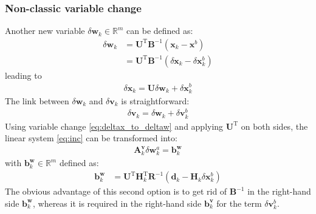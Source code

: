 \documentclass[12pt]{scrartcl}
\begin{document}
\subsubsection{Non-classic variable change}
Another new variable $\delta \mathbf{w}_k \in \mathbb{R}^m$ can be defined as:
\begin{align}
\delta \mathbf{w}_k & = \mathbf{U}^\mathrm{T} \mathbf{B}^{-1} \left(\mathbf{x}_k - \mathbf{x}^b\right) \nonumber \\
 & = \mathbf{U}^\mathrm{T} \mathbf{B}^{-1} \left(\delta \mathbf{x}_k - \delta \mathbf{x}^b_k\right)
\end{align}
leading to
\begin{align}
\label{eq:deltax_to_deltaw}
\boxed{\delta \mathbf{x}_k = \mathbf{U} \delta \mathbf{w}_k + \delta \mathbf{x}^b_k}
\end{align}
The link between $\delta \mathbf{w}_k$ and $\delta \mathbf{v}_k$ is straightforward:
\begin{align}
\label{eq:link_deltaw-deltav}
\delta \mathbf{v}_k = \delta \mathbf{w}_k + \delta \mathbf{v}^b_k
\end{align}
Using variable change \eqref{eq:deltax_to_deltaw} and applying $\mathbf{U}^\mathrm{T}$ on both sides, the linear system \eqref{eq:inc} can be transformed into:
\begin{align}
\label{eq:inc_U_w}
\boxed{\mathbf{A}^\mathbf{v}_k \delta \mathbf{w}^a_k = \mathbf{b}^\mathbf{w}_k}
\end{align}
with $\mathbf{b}^\mathbf{w}_k \in \mathbb{R}^{m}$ defined as:
\begin{align}
\mathbf{b}^\mathbf{w}_k & = \mathbf{U}^\mathrm{T} \mathbf{H}_k^\mathrm{T} \mathbf{R}^{-1} \left(\mathbf{d}_k - \mathbf{H}_k \delta \mathbf{x}^b_k\right)
\end{align}
The obvious advantage of this second option is to get rid of $\mathbf{B}^{-1}$ in the right-hand side $\mathbf{b}^\mathbf{w}_k$, whereas it is required in the right-hand side $\mathbf{b}^\mathbf{v}_k$ for the term $\delta \mathbf{v}^b_k$.
\end{document}
